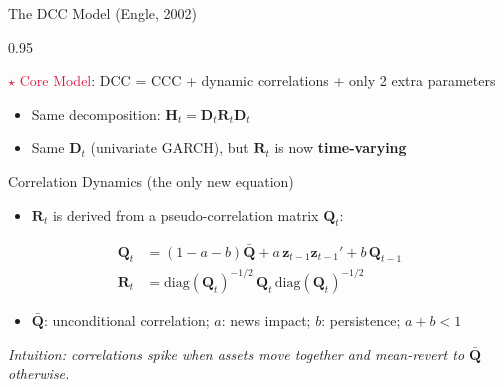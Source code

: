 \documentclass[9pt, aspectratio=169, t]{beamer}
\begin{document}
\begin{frame}{The DCC Model (Engle, 2002)}
    \begin{cminipage}{0.95\textwidth}
    {\footnotesize
    \begin{alertblock}{\textcolor{Crimson}{$\star$ Core Model}: DCC = CCC + dynamic correlations + only 2 extra parameters}
        \begin{itemize}\setlength{\itemsep}{0pt}
            \item Same decomposition: $\mathbf{H}_t = \mathbf{D}_t \mathbf{R}_t \mathbf{D}_t$
            \item Same $\mathbf{D}_t$ (univariate GARCH), but $\mathbf{R}_t$ is now \textbf{time-varying}
        \end{itemize}
    \end{alertblock}
    \vspace{0.1cm}
    \begin{block}{Correlation Dynamics (the only new equation)}
        \begin{itemize}\setlength{\itemsep}{0pt}
            \item $\mathbf{R}_t$ is derived from a pseudo-correlation matrix $\mathbf{Q}_t$:
        \end{itemize}
        \vspace{-2mm}
        \begin{align}
            \mathbf{Q}_t &= (1-a-b)\bar{\mathbf{Q}} + a\,\mathbf{z}_{t-1}\mathbf{z}_{t-1}' + b\,\mathbf{Q}_{t-1} \\
            \mathbf{R}_t &= \text{diag}(\mathbf{Q}_t)^{-1/2}\,\mathbf{Q}_t\,\text{diag}(\mathbf{Q}_t)^{-1/2}
        \end{align}
        \vspace{-2mm}
        \begin{itemize}\setlength{\itemsep}{0pt}
            \item $\bar{\mathbf{Q}}$: unconditional correlation; $a$: news impact; $b$: persistence; $a + b < 1$
        \end{itemize}
        \textit{Intuition: correlations spike when assets move together and mean-revert to $\bar{\mathbf{Q}}$ otherwise.}
    \end{block}
    }
    \end{cminipage}
\end{frame}
\end{document}
